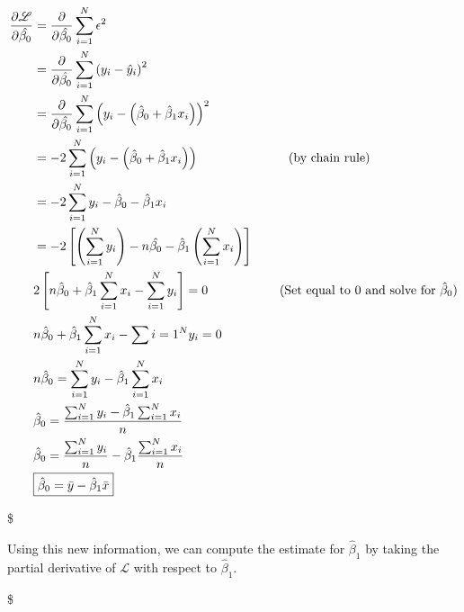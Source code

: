 \documentclass[11pt]{article}
\begin{document}
\begin{align}
\frac{\partial \mathscr{L}}{\partial \hat{\beta_0}} &= \frac{\partial}{\partial \hat{\beta_0}} \sum_{i=1}^N \epsilon^2 \\
&= \frac{\partial}{\partial \hat{\beta_0}} \sum_{i=1}^N \left( y_i - \hat{y}_i \right)^2 \\
&= \frac{\partial}{\partial \hat{\beta_0}} \sum_{i=1}^N \left( y_i - \left( \hat{\beta}_0 + \hat{\beta}_1 x_i \right) \right)^2 \\
&= -2 \sum_{i=1}^N \left( y_i - \left( \hat{\beta}_0 + \hat{\beta}_1 x_i \right) \right) \hspace{25mm} \mbox{(by chain rule)} \\
&= -2 \sum_{i=1}^N y_i - \hat{\beta}_0 - \hat{\beta}_1 x_i \\
&= -2 \left[ \left( \sum_{i=1}^N y_i \right) - n \hat{\beta_0} - \hat{\beta}_1 \left( \sum_{i=1}^N x_i
\right) \right] \\
& 2 \left[ n \hat{\beta}_0 + \hat{\beta}_1 \sum_{i=1}^N x_i - \sum_{i=1}^N y_i \right] = 0 \hspace{20mm} \mbox{(Set equal to 0 and solve for $\hat{\beta}_0$)} \\
& n \hat{\beta}_0 + \hat{\beta}_1 \sum_{i=1}^N x_i - \sum{i=1}^N y_i = 0 \\
& n \hat{\beta}_0 = \sum_{i=1}^N y_i - \hat{\beta}_1 \sum_{i=1}^N x_i \\
& \hat{\beta}_0 = \frac{\sum_{i=1}^N y_i - \hat{\beta}_1 \sum_{i=1}^N x_i}{n} \\
& \hat{\beta}_0 = \frac{\sum_{i=1}^N y_i}{n} - \hat{\beta}_1 \frac{\sum_{i=1}^N x_i}{n} \\
& \boxed{\hat{\beta}_0 = \bar{y} - \hat{\beta}_1 \bar{x}}
\end{align}

\$

    Using this new information, we can compute the estimate for
\(\hat{\beta}_1\) by taking the partial derivative of \(\mathscr{L}\)
with respect to \(\hat{\beta}_1\).

    \$
\end{document}
